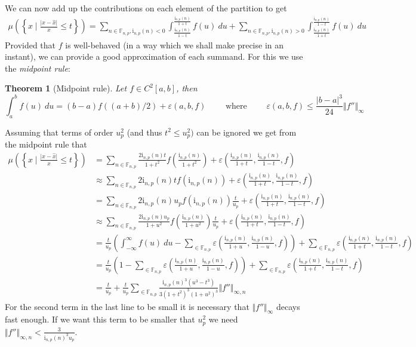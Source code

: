 \documentclass[10pt,a4paper]{article}
\theoremstyle{plain}
\newtheorem{theorem}{Theorem}
\theoremstyle{definition}
\newcommand{\F}[1][n,p]{\mathbb{F}_{#1}}
\newcommand{\Rep}[1][n,p]{\mathrm{i}_{#1}}
\newcommand{\absv}[1]{\vert #1\vert}
\newcommand{\norm}[1]{\Vert #1\Vert}
\newcommand{\uro}[1][p]{u_{#1}}
\begin{document}
We can now add up the contributions on each element of the partition to get
\begin{align*}
\mu\left(\left\{x\mid  \frac{\absv{x-\hat{x}}}{x}\leq t\right\}\right)=\sum_{n\in\F, \Rep(n)<0} \int^{\frac{\Rep(n)}{1+t}}_{\frac{\Rep(n)}{1-t}}f(u)~du +\sum_{n\in\F, \Rep(n)> 0} \int^{\frac{\Rep(n)}{1-t}}_{\frac{\Rep(n)}{1+t}}f(u)~du 
\end{align*}
Provided that $f$ is well-behaved (in a way which we shall make precise in an instant), we can provide a good approximation of each summand. For this we use the \emph{midpoint rule}:
\begin{theorem}[Midpoint rule]
Let $f\in C^2\left[a,b\right]$, then
\begin{equation}
\int_a^b f(u)~du =(b-a)f((a+b)/2)+ \varepsilon(a,b,f)\qquad\text{ where }\qquad \varepsilon(a,b,f)\leq\frac{\absv{b-a}^3}{24}\norm{f''}_{\infty} 
\end{equation}
\end{theorem}
Assuming that terms of order $\uro^2$ (and thus $t^2\leq \uro^2)$ can be ignored we get from the midpoint rule that
\begin{align*}
\mu\left(\left\{x\mid  \frac{\absv{x-\hat{x}}}{x}\leq t\right\}\right)&=\sum_{n\in \F} \frac{2\Rep(n) t}{1+t^2}f\left(\frac{\Rep(n)}{1+t^2}\right)+\varepsilon\left(\frac{\Rep(n)}{1+t},\frac{\Rep(n)}{1-t},f\right)\\
&\approx \sum_{n\in \F} 2\Rep(n) tf\left(\Rep(n)\right)+\varepsilon\left(\frac{\Rep(n)}{1+t},\frac{\Rep(n)}{1-t},f\right)\\
&= \sum_{n\in \F}2\Rep(n) \uro f(\Rep(n)) \frac{t}{\uro}+\varepsilon\left(\frac{\Rep(n)}{1+t},\frac{\Rep(n)}{1-t},f\right)\\
&\approx \sum_{n\in \F} \frac{2\Rep(n) \uro}{1+u^2}f\left(\frac{\Rep(n)}{1+u^2}\right)\frac{t}{\uro}+\varepsilon\left(\frac{\Rep(n)}{1+t},\frac{\Rep(n)}{1-t},f\right)\\
&=\frac{t}{\uro}\left(\int_{-\infty}^{\infty} f(u)~du -\sum_{\in\F}\varepsilon\left(\frac{\Rep(n)}{1+u},\frac{\Rep(n)}{1-u},f\right)\right)+\sum_{\in\F}\varepsilon\left(\frac{\Rep(n)}{1+t},\frac{\Rep(n)}{1-t},f\right)\\
&=\frac{t}{\uro}\left(1-\sum_{\in\F}\varepsilon\left(\frac{\Rep(n)}{1+u},\frac{\Rep(n)}{1-u},f\right)\right)+\sum_{\in\F}\varepsilon\left(\frac{\Rep(n)}{1+t},\frac{\Rep(n)}{1-t},f\right)\\
&=\frac{t}{\uro}+\frac{t}{\uro}\sum_{\in\F}\frac{\Rep(n)^3(u^3-t^3)}{3(1+t^2)^3(1+u^2)^3}\norm{f''}_{\infty,n}
\end{align*}
For the second term in the last line to be small it is necessary that $\norm{f''}_\infty$ decays fast enough. If we want this term to be smaller that $\uro^2$ we need $\norm{f''}_{\infty,n}<\frac{3}{\Rep(n)^3\uro}$. 
\end{document}
